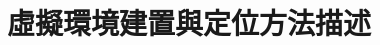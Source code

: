 \documentclass[12pt, a4paper]{ntust_report}
\begin{document}
\chapter{虛擬環境建置與定位方法描述}
\label{app}


%

%


\end{document}
